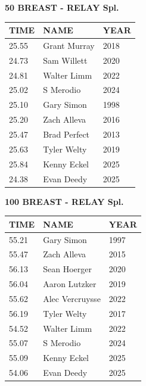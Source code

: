 \begin{table}[H]
\centering
\begin{minipage}[t]{0.6\textwidth}
\centering
\textbf{50 BREAST - RELAY Spl.}\\[0.1cm]
\begin{tabular}{@{}p{1.8cm}p{2.8cm}p{1.2cm}@{}}
\hline
    \textbf{TIME} & \textbf{NAME} & \textbf{YEAR} \\
\hline
    25.55 & Grant Murray & 2018 \\
    24.73 & Sam Willett & 2020 \\
    24.81 & Walter Limm & 2022 \\
    25.02 & S Merodio & 2024 \\
    25.10 & Gary Simon & 1998 \\
    25.20 & Zach Alleva & 2016 \\
    25.47 & Brad Perfect & 2013 \\
    25.63 & Tyler Welty & 2019 \\
    25.84 & Kenny Eckel & 2025 \\
    24.38 & Evan Deedy & 2025 \\
\hline
\end{tabular}
\end{minipage}
\end{table}

\begin{table}[H]
\centering
\begin{minipage}[t]{0.6\textwidth}
\centering
\textbf{100 BREAST - RELAY Spl.}\\[0.1cm]
\begin{tabular}{@{}p{1.8cm}p{2.8cm}p{1.2cm}@{}}
\hline
    \textbf{TIME} & \textbf{NAME} & \textbf{YEAR} \\
\hline
    55.21 & Gary Simon & 1997 \\
    55.47 & Zach Alleva & 2015 \\
    56.13 & Sean Hoerger & 2020 \\
    56.04 & Aaron Lutzker & 2019 \\
    55.62 & Alec Vercruysse & 2022 \\
    56.19 & Tyler Welty & 2017 \\
    54.52 & Walter Limm & 2022 \\
    55.07 & S Merodio & 2024 \\
    55.09 & Kenny Eckel & 2025 \\
    54.06 & Evan Deedy & 2025 \\
\hline
\end{tabular}
\end{minipage}
\end{table}


